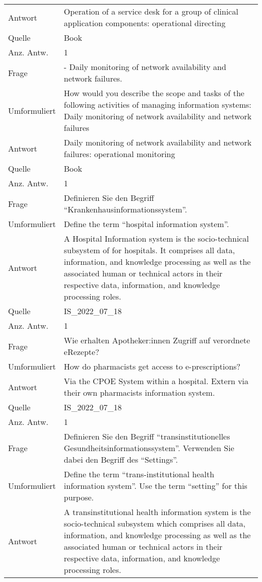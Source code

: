 \begin{landscape}
\begin{longtable}{p{3cm}p{}}
    Antwort & Operation of a service desk for a group of clinical application components: operational directing \\
    Quelle & Book \\
    Anz. Antw.& 1 \\
    \midrule
    Frage & - Daily monitoring of network availability and network failures.\\
    Umformuliert & How would you describe the scope and tasks of the following activities of managing information systems: Daily monitoring of network availability and network failures \\
    Antwort & Daily monitoring of network availability and network failures: operational monitoring \\
    Quelle & Book \\
    Anz. Antw.& 1 \\
    \midrule
    Frage & Definieren Sie den Begriff ``Krankenhausinformationssystem''. \\
    Umformuliert & Define the term ``hospital information system''. \\
    Antwort & A Hospital Information system is the socio-technical subsystem of for hospitals.
    It comprises all data, information, and knowledge processing as well as the associated human or technical actors in their respective data, information, and knowledge processing roles.\\
    Quelle & IS\_2022\_07\_18 \\
    Anz. Antw.& 1 \\
    \midrule
    Frage & Wie erhalten Apotheker:innen Zugriff auf verordnete eRezepte? \\
    Umformuliert & How do pharmacists get access to e-prescriptions? \\
    Antwort & Via the CPOE System within a hospital.
    Extern via their own pharmacists information system.\\
    Quelle & IS\_2022\_07\_18 \\
    Anz. Antw.& 1 \\
    \midrule
    Frage & Definieren Sie den Begriff ``transinstitutionelles Gesundheitsinformationssystem''. Verwenden Sie dabei den Begriff des ``Settings''. \\
    Umformuliert & Define the term ``trans-institutional health information system''. Use the term ``setting'' for this purpose.\\
    Antwort & A transinstitutional health information system is the socio-technical subsystem which comprises all data, information, and knowledge processing as well as the associated human or technical actors in their respective data, information, and knowledge processing roles.

\end{longtable}
\end{landscape}
